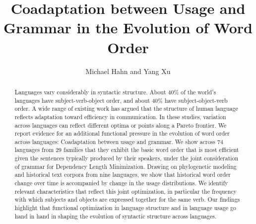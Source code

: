 \documentclass[11pt,a4paper]{article}
\title{Coadaptation between Usage and Grammar in the Evolution of Word Order}
\author{Michael Hahn and Yang Xu}
\begin{document}
\maketitle


\begin{abstract}
Languages vary considerably in syntactic structure.
About 40\% of the world's languages have subject-verb-object order, and about 40\% have subject-object-verb order.
A wide range of existing work has argued that the structure of human language reflects adaptation toward efficiency in communication.
In these studies, variation across languages can reflect different optima or points along a Pareto frontier.
We report evidence for an additional functional pressure in the evolution of word order across languages:
Coadaptation between usage and grammar.
We show across 74 languages from 29 families that they exhibit the basic word order that is most efficient given the sentences typically produced by their speakers, under the joint consideration of grammar for Dependency Length Minimization.
Drawing on phylogenetic modeling and historical text corpora from nine languages, we show that historical word order change over time is accompanied by change in the usage distributions.
We identify relevant characteristics that reflect this joint optimization, in particular the frequency with which subjects and objects are expressed together for the same verb.
Our findings highlight that functional optimization in language structure and in language usage go hand in hand in shaping the evolution of syntactic structure across languages.
\end{abstract}



\end{document}
